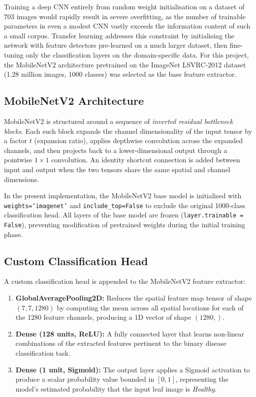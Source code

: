 \documentclass[12pt,a4paper]{report}
\begin{document}
Training a deep CNN entirely from random weight initialisation on a dataset of 703 images would rapidly result in severe overfitting, as the number of trainable parameters in even a modest CNN vastly exceeds the information content of such a small corpus. Transfer learning addresses this constraint by initialising the network with feature detectors pre-learned on a much larger dataset, then fine-tuning only the classification layers on the domain-specific data. For this project, the MobileNetV2 architecture pretrained on the ImageNet LSVRC-2012 dataset (1.28 million images, 1000 classes) was selected as the base feature extractor.

\subsection{MobileNetV2 Architecture}

MobileNetV2 is structured around a sequence of \textit{inverted residual bottleneck blocks}. Each such block expands the channel dimensionality of the input tensor by a factor $t$ (expansion ratio), applies depthwise convolution across the expanded channels, and then projects back to a lower-dimensional output through a pointwise $1\times1$ convolution. An identity shortcut connection is added between input and output when the two tensors share the same spatial and channel dimensions.

In the present implementation, the MobileNetV2 base model is initialised with \texttt{weights=`imagenet'} and \texttt{include\_top=False} to exclude the original 1000-class classification head. All layers of the base model are frozen (\texttt{layer.trainable = False}), preventing modification of pretrained weights during the initial training phase.

\subsection{Custom Classification Head}

A custom classification head is appended to the MobileNetV2 feature extractor:

\begin{enumerate}[label=\arabic*., itemsep=4pt]
    \item \textbf{GlobalAveragePooling2D:} Reduces the spatial feature map tensor of shape $(7, 7, 1280)$ by computing the mean across all spatial locations for each of the 1280 feature channels, producing a 1D vector of shape $(1280,)$.
    \item \textbf{Dense (128 units, ReLU):} A fully connected layer that learns non-linear combinations of the extracted features pertinent to the binary disease classification task.
    \item \textbf{Dense (1 unit, Sigmoid):} The output layer applies a Sigmoid activation to produce a scalar probability value bounded in $[0, 1]$, representing the model's estimated probability that the input leaf image is \textit{Healthy}.
\end{enumerate}
\end{document}

